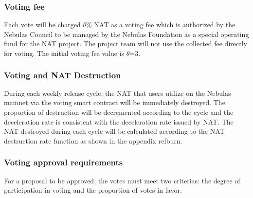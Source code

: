 \subsubsection{Voting fee}

Each vote will be charged $\theta$\% NAT as a voting fee which is authorized by the Nebulas Council to be managed by the Nebulas Foundation as a special operating fund for the NAT project. The project team will not use the collected fee directly for voting. The initial voting fee value is $\theta$=3.

\subsubsection{Voting and NAT Destruction}

During each weekly release cycle, the NAT that users utilize on the Nebulas mainnet via the voting smart contract will be immediately destroyed. The proportion of destruction will be decremented according to the cycle and the deceleration rate is consistent with the deceleration rate issued by NAT. The NAT destroyed during each cycle will be calculated according to the NAT destruction rate function as shown in the appendix ref{burn}.

\subsubsection{Voting approval requirements}

For a proposal to be approved, the votes must meet two criterias: the degree of participation in voting and the proportion of votes in favor.

